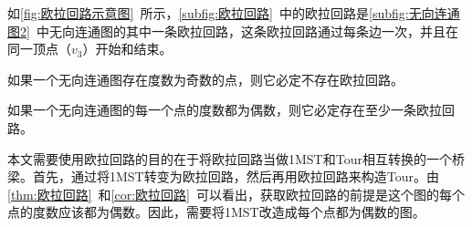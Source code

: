 \par
如\autoref{fig:欧拉回路示意图}~所示，\autoref{subfig:欧拉回路}~中的欧拉回路是\autoref{subfig:无向连通图2}~中无向连通图的其中一条欧拉回路，这条欧拉回路通过每条边一次，并且在同一顶点（$v_3$）开始和结束。
\begin{theorem}
    \label{thm:欧拉回路}
    如果一个无向连通图存在度数为奇数的点，则它必定不存在欧拉回路。
\end{theorem}
\begin{corollary}
    \label{cor:欧拉回路}
    如果一个无向连通图的每一个点的度数都为偶数，则它必定存在至少一条欧拉回路。
\end{corollary}
\par
本文需要使用欧拉回路的目的在于将欧拉回路当做1MST和Tour相互转换的一个桥梁。首先，通过将1MST转变为欧拉回路，然后再用欧拉回路来构造Tour。由\autoref{thm:欧拉回路}~和\autoref{cor:欧拉回路}~可以看出，获取欧拉回路的前提是这个图的每个点的度数应该都为偶数。因此，需要将1MST改造成每个点都为偶数的图。

